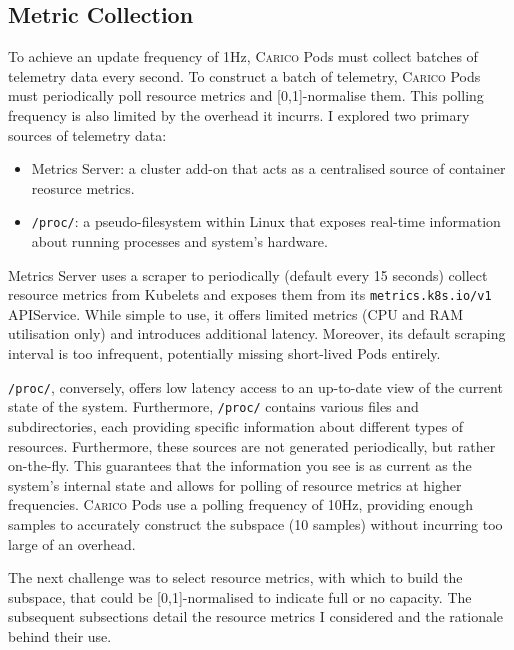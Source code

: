 \subsection{Metric Collection}
To achieve an update frequency of 1Hz, \textsc{Carico} Pods must collect batches
of telemetry data every second. To construct a batch of telemetry,
\textsc{Carico} Pods must periodically poll resource metrics and [0,1]-normalise
them. This polling frequency is also limited by the overhead it incurrs. I
explored two primary sources of telemetry data:
\begin{itemize}
    \item Metrics Server: a cluster add-on that acts as a centralised source of
        container reosurce metrics.
    \item \verb|/proc/|: a pseudo-filesystem within Linux that exposes real-time
        information about running processes and system's hardware.
\end{itemize}

Metrics Server uses a scraper to periodically (default every 15 seconds) collect
resource metrics from Kubelets and exposes them from its
\verb|metrics.k8s.io/v1| APIService. While simple to use, it offers limited
metrics (CPU and RAM utilisation only) and introduces additional latency.
Moreover, its default scraping interval is too infrequent, potentially missing
short-lived Pods entirely.

\verb|/proc/|, conversely, offers low latency access to an up-to-date view
of the current state of the system. Furthermore, \verb|/proc/| contains various
files and subdirectories, each providing specific information about different
types of resources. Furthermore, these sources are not generated periodically,
but rather on-the-fly. This guarantees that the information you see is as
current as the system's internal state and allows for polling of resource
metrics at higher frequencies. \textsc{Carico} Pods use a polling
frequency of 10Hz, providing enough samples to accurately construct the subspace
(10 samples) without incurring too large of an overhead.

The next challenge was to select resource metrics, with which to build the
subspace, that could be [0,1]-normalised to indicate full or no capacity. The
subsequent subsections detail the resource metrics I considered and the
rationale behind their use.

